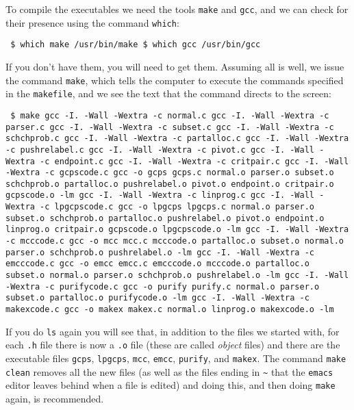 \documentclass[12pt]{article}
\theoremstyle{definition}
\begin{document}
To compile the executables we need the tools \texttt{make} and
\texttt{gcc}, and we can check for their presence using
the command \texttt{which}:
\begin{obeylines}
  \texttt{
    \$ which make
    /usr/bin/make
    \$ which gcc
    /usr/bin/gcc
    }
\end{obeylines}
\bigskip \noindent If you don't have them, you will need to get them.
Assuming all is well, we issue the command \texttt{make}, which tells
the computer to execute the commands specified in the
\texttt{makefile}, and we see the text that the command directs to the
screen:
\begin{obeylines}
  \texttt{
    \$ make
gcc -I. -Wall -Wextra  -c normal.c 
gcc -I. -Wall -Wextra  -c parser.c
gcc -I. -Wall -Wextra  -c subset.c
gcc -I. -Wall -Wextra  -c schchprob.c
gcc -I. -Wall -Wextra  -c partalloc.c
gcc -I. -Wall -Wextra  -c pushrelabel.c
gcc -I. -Wall -Wextra  -c pivot.c 
gcc -I. -Wall -Wextra  -c endpoint.c
gcc -I. -Wall -Wextra  -c critpair.c
gcc -I. -Wall -Wextra  -c gcpscode.c
gcc -o gcps gcps.c normal.o parser.o subset.o schchprob.o partalloc.o pushrelabel.o pivot.o endpoint.o critpair.o gcpscode.o -lm
gcc -I. -Wall -Wextra  -c linprog.c 
gcc -I. -Wall -Wextra  -c lpgcpscode.c
gcc -o lpgcps lpgcps.c normal.o parser.o subset.o schchprob.o partalloc.o pushrelabel.o pivot.o endpoint.o linprog.o critpair.o gcpscode.o lpgcpscode.o -lm
gcc -I. -Wall -Wextra  -c mcccode.c
gcc -o mcc mcc.c mcccode.o partalloc.o subset.o normal.o parser.o schchprob.o pushrelabel.o  -lm
gcc -I. -Wall -Wextra  -c emcccode.c
gcc -o emcc emcc.c emcccode.o mcccode.o partalloc.o subset.o normal.o parser.o schchprob.o pushrelabel.o -lm
gcc -I. -Wall -Wextra  -c purifycode.c
gcc -o purify purify.c normal.o parser.o subset.o partalloc.o purifycode.o -lm
gcc -I. -Wall -Wextra  -c makexcode.c
gcc -o makex makex.c normal.o linprog.o makexcode.o -lm
    } 
\end{obeylines}
\bigskip

If you do \texttt{ls} again you will see that, in addition to the
files we started with, for each \texttt{.h} file there is now a
\texttt{.o} file (these are called \emph{object} files) and there are
the executable files \texttt{gcps}, \texttt{lpgcps}, \texttt{mcc},
\texttt{emcc}, \texttt{purify}, and \texttt{makex}.  The command
\texttt{make clean} removes all the new files (as well as the files
ending in \texttt{\~} that the \texttt{emacs} editor leaves behind when
a file is edited) and doing this, and then doing \texttt{make} again,
is recommended.
\end{document}
